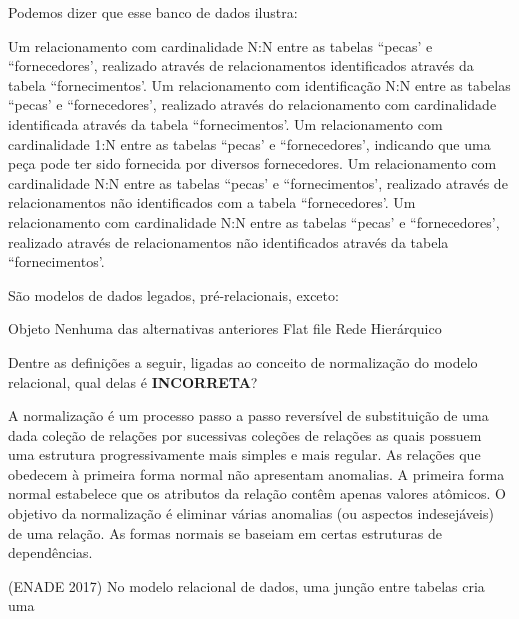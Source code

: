 \documentclass[12pt, addpoints]{exam}
\begin{document}
\begin{questions}
Podemos dizer que esse banco de dados ilustra:
\begin{choices}
\choice Um relacionamento com cardinalidade N:N entre as tabelas ``pecas' e ``fornecedores', realizado através de relacionamentos identificados através da tabela ``fornecimentos'. 
\choice Um relacionamento com identificação N:N entre as tabelas ``pecas' e ``fornecedores', realizado através do relacionamento com cardinalidade identificada através da tabela ``fornecimentos'. 
\choice Um relacionamento com cardinalidade 1:N entre as tabelas ``pecas' e ``fornecedores', indicando que uma peça pode ter sido fornecida por diversos fornecedores. 
\choice Um relacionamento com cardinalidade N:N entre as tabelas ``pecas' e ``fornecimentos', realizado através de relacionamentos não identificados com a tabela ``fornecedores'. 
\choice Um relacionamento com cardinalidade N:N entre as tabelas ``pecas' e ``fornecedores', realizado através de relacionamentos não identificados através da tabela ``fornecimentos'. 
\end{choices}

\question

São modelos de dados legados, pré-relacionais, exceto:


\begin{choices}
\choice Objeto
\choice Nenhuma das alternativas anteriores
\choice Flat file
\choice Rede
\choice Hierárquico
\end{choices}

\question

Dentre as definições a seguir, ligadas ao conceito de normalização do modelo relacional, qual delas é \textbf{INCORRETA}?


\begin{choices}
\choice A normalização é um processo passo a passo reversível de substituição de uma dada coleção de relações por sucessivas coleções de relações as quais possuem uma estrutura progressivamente mais simples e mais regular.
\choice As relações que obedecem à primeira forma normal não apresentam anomalias.
\choice A primeira forma normal estabelece que os atributos da relação contêm apenas valores atômicos.
\choice O objetivo da normalização é eliminar várias anomalias (ou aspectos indesejáveis) de uma relação.
\choice As formas normais se baseiam em certas estruturas de dependências.
\end{choices}

\question

(ENADE 2017) No modelo relacional de dados, uma junção entre tabelas cria uma


\end{questions}
\end{document}

